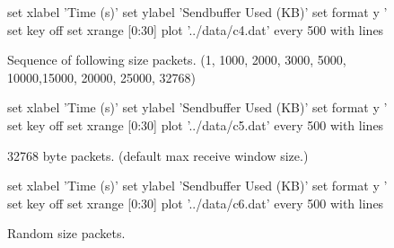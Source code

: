 \documentclass[a4paper,11pt]{article}
\begin{document}
\begin{figure}
	\centering
	\begin{gnuplot}[terminal=cairolatex,
		terminaloptions={size \convertlen{0.95\linewidth},
			\convertlen{0.95\textheight}}]
		set xlabel 'Time (s)'
		set ylabel 'Sendbuffer Used (KB)\vspace{0.5cm}'
		set format y '%
		set key off
		set xrange [0:30]
		plot '../data/c4.dat' every 500 with lines
	\end{gnuplot}
	\caption{Sequence of following size packets.
		(1, 1000, 2000, 3000, 5000, 10000,15000, 20000, 25000, 32768)}
\end{figure}

\begin{figure}
	\centering
	\begin{gnuplot}[terminal=cairolatex,
		terminaloptions={size \convertlen{0.95\linewidth},
			\convertlen{0.95\textheight}}]
		set xlabel 'Time (s)'
		set ylabel 'Sendbuffer Used (KB)\vspace{0.5cm}'
		set format y '%
		set key off
		set xrange [0:30]
		plot '../data/c5.dat' every 500 with lines
	\end{gnuplot}
	\caption{32768 byte packets.
		(default max receive window size.)}
\end{figure}

\begin{figure}
	\centering
	\begin{gnuplot}[terminal=cairolatex,
		terminaloptions={size \convertlen{0.95\linewidth},
			\convertlen{0.95\textheight}}]
		set xlabel 'Time (s)'
		set ylabel 'Sendbuffer Used (KB)\vspace{0.5cm}'
		set format y '%
		set key off
		set xrange [0:30]
		plot '../data/c6.dat' every 500 with lines
	\end{gnuplot}
	\caption{Random size packets.}
\end{figure}
\end{document}
